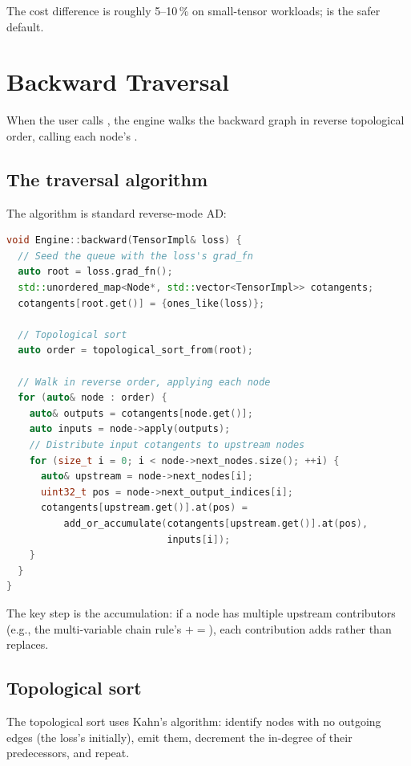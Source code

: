 The cost difference is roughly 5--10\,\% on small-tensor
workloads;  is the safer default.

\section{Backward Traversal}
\label{sec:autograd_engine:traversal}

When the user calls , the engine walks the
backward graph in reverse topological order, calling each node's
.

\subsection{The traversal algorithm}
\label{ssec:autograd_engine:algorithm}

The algorithm is standard reverse-mode AD:

\begin{lstlisting}[style=lucidcpp,language=C++]
void Engine::backward(TensorImpl& loss) {
  // Seed the queue with the loss's grad_fn
  auto root = loss.grad_fn();
  std::unordered_map<Node*, std::vector<TensorImpl>> cotangents;
  cotangents[root.get()] = {ones_like(loss)};

  // Topological sort
  auto order = topological_sort_from(root);

  // Walk in reverse order, applying each node
  for (auto& node : order) {
    auto& outputs = cotangents[node.get()];
    auto inputs = node->apply(outputs);
    // Distribute input cotangents to upstream nodes
    for (size_t i = 0; i < node->next_nodes.size(); ++i) {
      auto& upstream = node->next_nodes[i];
      uint32_t pos = node->next_output_indices[i];
      cotangents[upstream.get()].at(pos) =
          add_or_accumulate(cotangents[upstream.get()].at(pos),
                            inputs[i]);
    }
  }
}
\end{lstlisting}

The key step is the accumulation: if a node has multiple
upstream contributors (e.g., the multi-variable chain rule's
$+=$), each contribution adds rather than replaces.

\subsection{Topological sort}
\label{ssec:autograd_engine:topo_sort}

The topological sort uses Kahn's algorithm: identify nodes with
no outgoing edges (the loss's  initially), emit
them, decrement the in-degree of their predecessors, and repeat.

